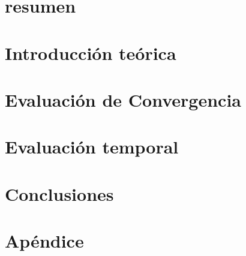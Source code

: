 


 



\section*{resumen}


\vspace{2em}
\tableofcontents
\newpage

\section{Introducción teórica}

\newpage

\section{Evaluación de Convergencia}

\newpage

\section{Evaluación temporal}

\newpage

\section{Conclusiones}

\newpage

\section{Apéndice}


%
%


